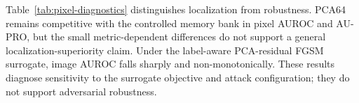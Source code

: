 Table~\ref{tab:pixel-diagnostics} distinguishes localization from robustness. PCA64 remains competitive with the controlled memory bank in pixel AUROC and AU-PRO, but the small metric-dependent differences do not support a general localization-superiority claim. Under the label-aware PCA-residual FGSM surrogate, image AUROC falls sharply and non-monotonically. These results diagnose sensitivity to the surrogate objective and attack configuration; they do not support adversarial robustness.

